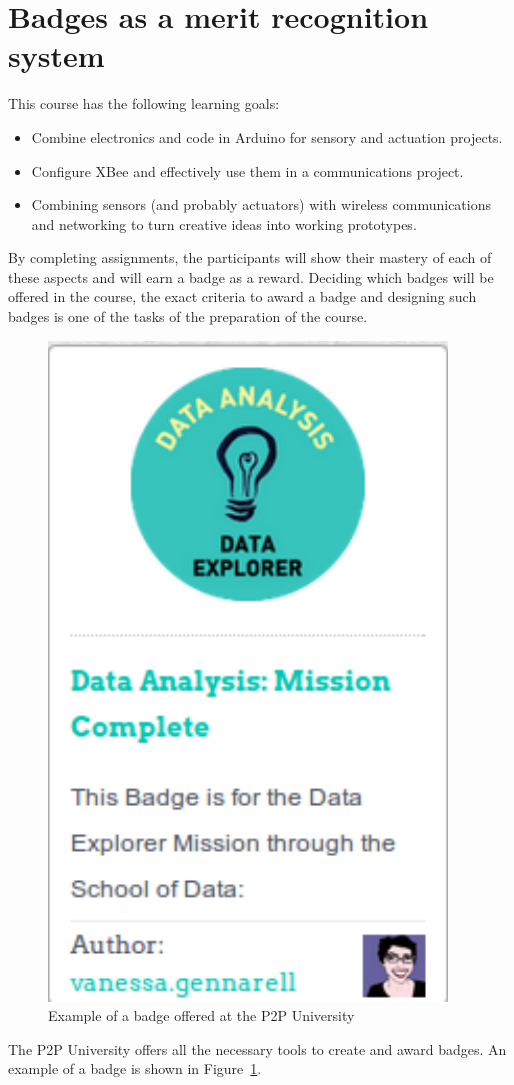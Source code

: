 \documentclass[oneside]{book}   %
\begin{document}
\section{Badges as a merit recognition system}

This course has the following learning goals:
\begin{itemize}
\item Combine electronics and code in Arduino for sensory and actuation projects.
\item Configure XBee and effectively use them in a communications project.
\item Combining sensors (and probably actuators) with wireless communications and networking to turn creative ideas into working prototypes.
\end{itemize}

By completing assignments, the participants will show their mastery of each of these aspects and will earn a badge as a reward.
Deciding which badges will be offered in the course, the exact criteria to award a badge and designing such badges is one of the tasks of the preparation of the course.

\begin{figure}
\begin{center}
\includegraphics[width=0.40\linewidth]{badge}
\caption{Example of a badge offered at the P2P University}
\label{fig:badge}
\end{center}
\end{figure}

The P2P University offers all the necessary tools to create and award badges.
An example of a badge is shown in Figure~\ref{fig:badge}.

\end{document}
